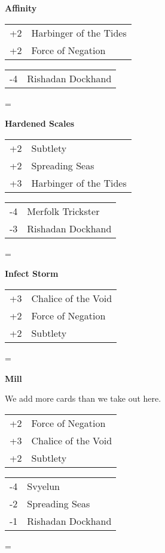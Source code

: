 \documentclass[fontsize=12pt,paper=a4]{scrartcl}
\newenvironment{absolutelynopagebreak}
  {\par\nobreak\vfil\penalty0\vfilneg
   \vtop\bgroup}
  {\par\xdef\tpd{\the\prevdepth}\egroup
   \prevdepth=\tpd}
\newenvironment{decklist}{%
    \begin{tabular}{>{\hspace{-4pt}}r<{\hspace{-3pt}}>{\hspace{-3pt}}l<{\hspace{-4pt}}}
    }{%
    \end{tabular}
    \par
}
\newcommand{\card}[2]{#1 & #2\\}
\newenvironment{sideboardguide}{%
    \newpage
    \begin{multicols}{4}
        \begin{small}
        }{%
        \end{small}
    \end{multicols}
}
\newenvironment{matchup}[1]{%
    \begin{absolutelynopagebreak}
        \textbf{#1}\par
    }{%
    \end{absolutelynopagebreak}
    \par\vspace{2em}
}
\newenvironment{notes}{%
}{%
    \par
}
\begin{document}
\begin{sideboardguide}
\begin{matchup}{Affinity}
\begin{decklist}
            \card{+2}{Harbinger of the Tides}
            \card{+2}{Force of Negation}
        \end{decklist}
        \begin{decklist}
            \card{-4}{Rishadan Dockhand}
        \end{decklist}
    \end{matchup}
    \begin{matchup}{Hardened Scales}
        \begin{decklist}
            \card{+2}{Subtlety}
            \card{+2}{Spreading Seas}
            \card{+3}{Harbinger of the Tides}
        \end{decklist}
        \begin{decklist}
            \card{-4}{Merfolk Trickster}
            \card{-3}{Rishadan Dockhand}
        \end{decklist}
    \end{matchup}
    \begin{matchup}{Infect Storm}
        \begin{decklist}
            \card{+3}{Chalice of the Void}
            \card{+2}{Force of Negation}
            \card{+2}{Subtlety}
        \end{decklist}
    \end{matchup}
    \begin{matchup}{Mill}
        \begin{notes}
            We add more cards than we take out here.
        \end{notes}
        \begin{decklist}
            \card{+2}{Force of Negation}
            \card{+3}{Chalice of the Void}
            \card{+2}{Subtlety}
        \end{decklist}
        \begin{decklist}
            \card{-4}{Svyelun}
            \card{-2}{Spreading Seas}
            \card{-1}{Rishadan Dockhand}
        \end{decklist}
    \end{matchup}
\end{sideboardguide}
\end{document}

